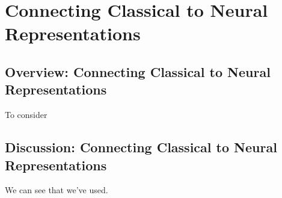 \documentclass{book}
\begin{document}
	
\part{Connecting Classical to Neural Representations}

\chapter{Overview: Connecting Classical to Neural Representations}
To consider






\chapter{Discussion: Connecting Classical to Neural Representations}
We can see that we've used.
\end{document}
